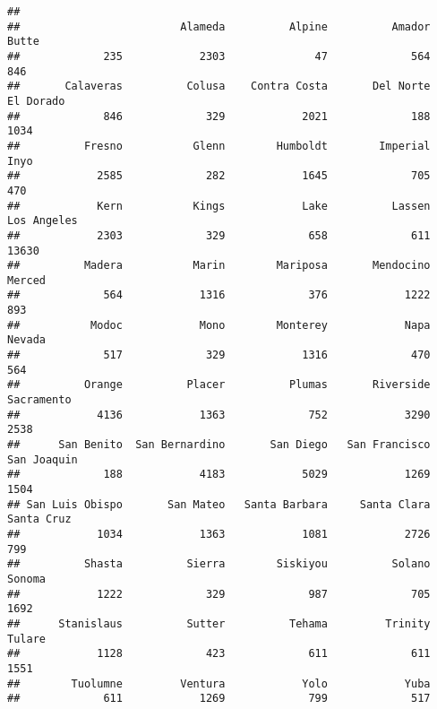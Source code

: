 \documentclass[
]{article}
\newenvironment{Shaded}{\begin{snugshade}}{\end{snugshade}}
\newcommand{\FunctionTok}[1]{\textcolor[rgb]{0.00,0.00,0.00}{#1}}
\newcommand{\NormalTok}[1]{#1}
\newcommand{\OtherTok}[1]{\textcolor[rgb]{0.56,0.35,0.01}{#1}}
\newcommand{\SpecialCharTok}[1]{\textcolor[rgb]{0.00,0.00,0.00}{#1}}
\newcommand{\StringTok}[1]{\textcolor[rgb]{0.31,0.60,0.02}{#1}}
\begin{document}
\begin{verbatim}
## 
##                         Alameda          Alpine          Amador           Butte 
##             235            2303              47             564             846 
##       Calaveras          Colusa    Contra Costa       Del Norte       El Dorado 
##             846             329            2021             188            1034 
##          Fresno           Glenn        Humboldt        Imperial            Inyo 
##            2585             282            1645             705             470 
##            Kern           Kings            Lake          Lassen     Los Angeles 
##            2303             329             658             611           13630 
##          Madera           Marin        Mariposa       Mendocino          Merced 
##             564            1316             376            1222             893 
##           Modoc            Mono        Monterey            Napa          Nevada 
##             517             329            1316             470             564 
##          Orange          Placer          Plumas       Riverside      Sacramento 
##            4136            1363             752            3290            2538 
##      San Benito  San Bernardino       San Diego   San Francisco     San Joaquin 
##             188            4183            5029            1269            1504 
## San Luis Obispo       San Mateo   Santa Barbara     Santa Clara      Santa Cruz 
##            1034            1363            1081            2726             799 
##          Shasta          Sierra        Siskiyou          Solano          Sonoma 
##            1222             329             987             705            1692 
##      Stanislaus          Sutter          Tehama         Trinity          Tulare 
##            1128             423             611             611            1551 
##        Tuolumne         Ventura            Yolo            Yuba 
##             611            1269             799             517
\end{verbatim}

\begin{Shaded}
\end{Shaded}
\end{document}
